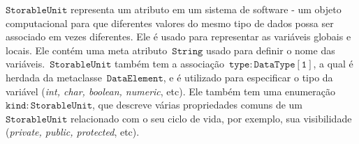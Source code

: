 


$\mathtt{StorableUnit}$ representa um atributo em um sistema de software - um objeto computacional para que diferentes valores do mesmo tipo de dados possa ser associado em vezes diferentes. Ele é usado para representar as variáveis globais e locais. Ele contém uma meta atributo~$\mathtt{String}$ usado para definir o nome das variáveis.~$\mathtt{StorableUnit}$ também tem a associação~$\mathtt{type:DataType[1]}$, a qual é herdada da metaclasse~$\mathtt{DataElement}$, e é utilizado para especificar o tipo da variável (\textit{int, char, boolean, numeric}, etc). Ele também tem uma enumeração ~$\mathtt{kind:StorableUnit}$, que descreve várias propriedades comuns de um ~$\mathtt{StorableUnit}$ relacionado com o seu ciclo de vida, por exemplo, sua visibilidade (\textit{private, public, protected}, etc).


